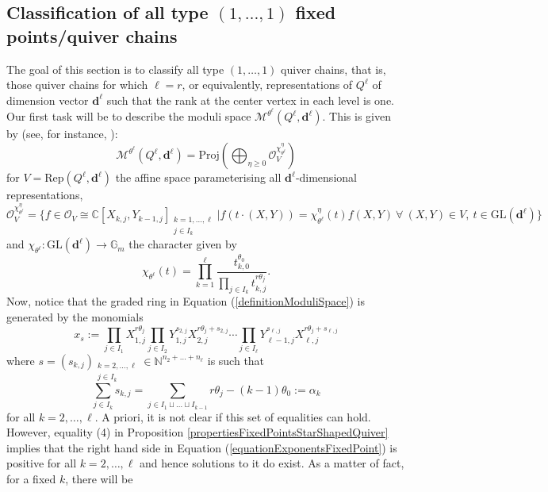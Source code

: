 \documentclass{amsart}
\theoremstyle{plain}
\numberwithin{equation}{section}
\theoremstyle{definition}
\theoremstyle{remark}
\begin{document}
	\subsection{Classification of all type $(1,\ldots,1)$ fixed points/quiver chains}
	The goal of this section is to classify all type $(1,\ldots,1)$ quiver chains, that is, those quiver chains for which $\ell=r$, or equivalently, representations of $Q^\ell$ of dimension vector $\mathbf{d}^\ell$ such that the rank at the center vertex in each level is one. Our first task will be to describe the moduli space $\mathcal{M}^{\theta^\ell}(Q^\ell,\mathbf{d}^\ell)$.  This is given by (see, for instance, \cite[p.597]{ReinekeSurvey}):
	\begin{equation}\label{definitionModuliSpace}
		\mathcal{M}^{\theta^\ell}(Q^\ell,\mathbf{d}^\ell)=\text{Proj}(\bigoplus_{\eta\geq 0}\mathcal{O}_{V}^{\chi^\eta_{\theta^\ell}})
	\end{equation}
	for $V=\text{Rep}(Q^\ell,\mathbf{d}^\ell)$ the affine space parameterising all $\mathbf{d}^\ell$-dimensional representations,
	$$
	\mathcal{O}_V^{\chi^\eta_{\theta^\ell}}=\{f\in \mathcal{O}_V\cong \mathbb{C}[X_{k,j},Y_{k-1,j}]_{\substack{k=1,\ldots,\ell\\j\in I_k}}|f(t\cdot (X,Y))=\chi^\eta_{\theta^\ell}(t)f(X,Y)\ \forall\ (X,Y)\in V,\ t\in \text{GL}(\mathbf{d}^\ell)\}
	$$
	and $\chi_{\theta^\ell}:\text{GL}(\mathbf{d}^\ell)\to \mathbb{G}_m$ the character given by 
	$$
	\chi_{\theta^\ell}(t)=\prod_{k=1}^{\ell}\frac{t_{k,0}^{\theta_0}}{\prod_{j\in I_k}t_{k,j}^{r\theta_j}}.
	$$
	Now, notice that the graded ring in Equation (\ref{definitionModuliSpace}) is generated by the monomials
	$$
	x_{s}:=\prod_{j\in I_1}X_{1,j}^{r\theta_j}\prod_{j\in I_2}Y_{1,j}^{s_{2,j}}X_{2,j}^{r\theta_j+s_{2,j}}\cdots\prod_{j\in I_\ell}Y_{\ell-1,j}^{s_{\ell,j}}X_{\ell,j}^{r\theta_j+s_{\ell,j}}
	$$
	where $s=(s_{k,j})_{\substack{k=2,\ldots,\ell \\ j\in I_k}}\in \mathbb{N}^{n_2+\ldots+n_\ell}$ is such that 
	\begin{equation}\label{equationExponentsFixedPoint}
		\sum_{j\in I_k}s_{k,j}=\sum_{j\in I_1\sqcup\ldots\sqcup I_{k-1}}r\theta_j-(k-1)\theta_0:=\alpha_k
	\end{equation}
	for all  $k=2,\ldots,\ell$. A priori, it is not clear if this set of equalities can hold. However, equality (4) in Proposition \ref{propertiesFixedPointsStarShapedQuiver} implies that the right hand side in Equation (\ref{equationExponentsFixedPoint}) is positive for all $k=2,\ldots,\ell$ and hence solutions to it do exist. As a matter of fact, for a fixed $k$, there will be 
\end{document}

